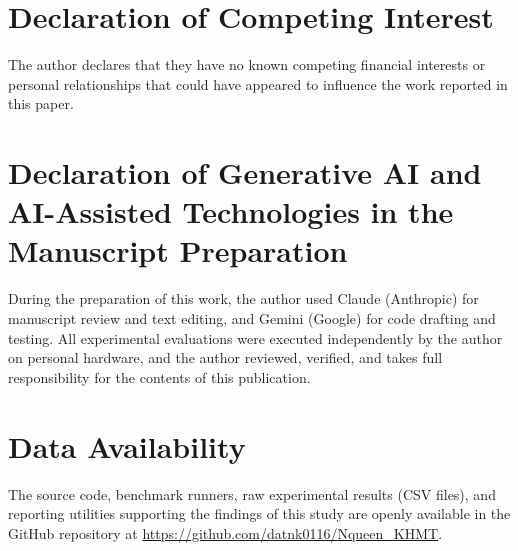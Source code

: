 \documentclass[a4paper,fleqn]{cas-sc}
\begin{document}
\section*{Declaration of Competing Interest}
The author declares that they have no known competing financial interests or personal relationships that could have appeared to influence the work reported in this paper.

\section*{Declaration of Generative AI and AI-Assisted Technologies in the Manuscript Preparation}
During the preparation of this work, the author used Claude (Anthropic) for manuscript review and text editing, and Gemini (Google) for code drafting and testing. All experimental evaluations were executed independently by the author on personal hardware, and the author reviewed, verified, and takes full responsibility for the contents of this publication.

\section*{Data Availability}
The source code, benchmark runners, raw experimental results (CSV files), and reporting utilities supporting the findings of this study are openly available in the GitHub repository at \url{https://github.com/datnk0116/Nqueen_KHMT}.

\clearpage
\addtocounter{page}{-1}
\end{document}
